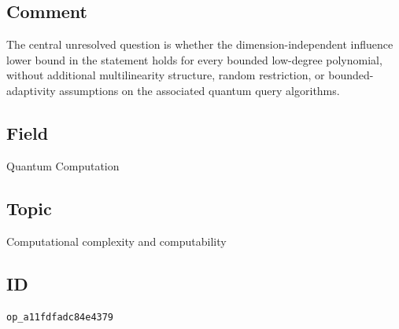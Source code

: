 \subsection*{Comment}

The central unresolved question is whether the dimension-independent
influence lower bound in the statement holds for every bounded low-degree
polynomial, without additional multilinearity structure, random restriction,
or bounded-adaptivity assumptions on the associated quantum query
algorithms.

\subsection*{Field}

Quantum Computation

\subsection*{Topic}

Computational complexity and computability

\subsection*{ID}

\texttt{op\_a11fdfadc84e4379}
